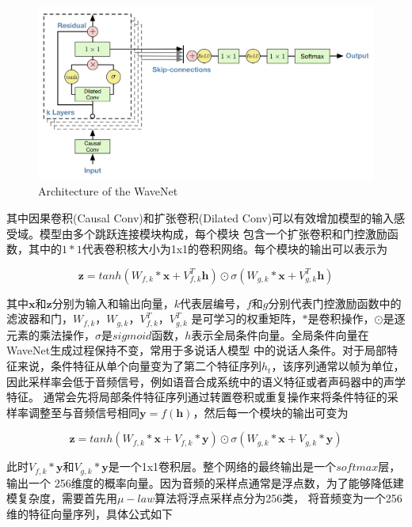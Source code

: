 \begin{figure}[!htp]
    \centering
    \includegraphics[width=12cm,trim=0 10 0 0,clip]{figure/4_wavenet.png}
    {Architecture of the WaveNet}
    \label{fig:wavenetarch}
\end{figure}

其中因果卷积(Causal Conv)和扩张卷积(Dilated Conv)可以有效增加模型的输入感受域。模型由多个跳跃连接模块构成，每个模块
包含一个扩张卷积和门控激励函数，其中的$1*1$代表卷积核大小为1x1的卷积网络。每个模块的输出可以表示为

\begin{equation}
    \mathbf{z} = tanh(W_{f,k} * \mathbf{x} + V^{T}_{f,k}\mathbf{h})\odot \sigma(W_{g,k} * \mathbf{x} + V^{T}_{g,k}\mathbf{h})
\end{equation}

其中$\mathbf{x}$和$\mathbf{z}$分别为输入和输出向量，$k$代表层编号，$f$和$g$分别代表门控激励函数中的滤波器和门，$W_{f,k}$，$W_{g,k}$，$V^T_{f,k}$，$V^T_{g,k}$
是可学习的权重矩阵，$*$是卷积操作，$\odot$是逐元素的乘法操作，$\sigma$是$sigmoid$函数，$h$表示全局条件向量。全局条件向量在WaveNet生成过程保持不变，常用于多说话人模型
中的说话人条件。对于局部特征来说，条件特征从单个向量变为了第二个特征序列$h_t$，该序列通常以帧为单位，因此采样率会低于音频信号，例如语音合成系统中的语义特征或者声码器中的声学特征。
通常会先将局部条件特征序列通过转置卷积或重复操作来将条件特征的采样率调整至与音频信号相同$\mathbf{y} = f(\mathbf{h})$，然后每一个模块的输出可变为

\begin{equation}
    \mathbf{z} = tanh(W_{f,k} * \mathbf{x} + V_{f,k} * \mathbf{y}) \odot \sigma (W_{g,k} * \mathbf{x} + V_{g,k} * \mathbf{y})
\end{equation}

此时$V_{f,k} * \mathbf{y}$和$V_{g,k} * \mathbf{y}$是一个1x1卷积层。整个网络的最终输出是一个$softmax$层，输出一个
256维度的概率向量。因为音频的采样点通常是浮点数，为了能够降低建模复杂度，需要首先用$\mu-law$算法将浮点采样点分为256类，
将音频变为一个256维的特征向量序列，具体公式如下

